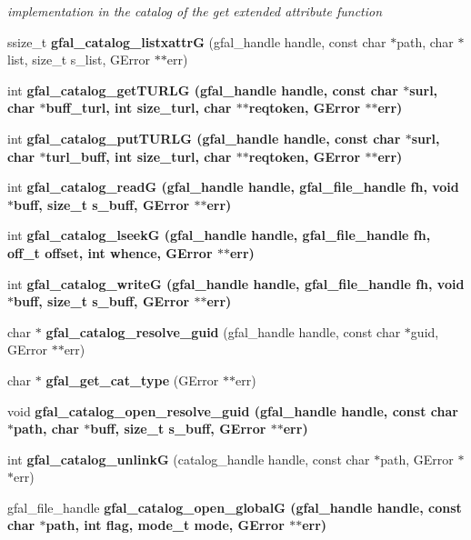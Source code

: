 \begin{CompactItemize}
\begin{CompactList}\small\item\em implementation in the catalog of the get extended attribute function \item\end{CompactList}\item 
ssize\_\-t \textbf{gfal\_\-catalog\_\-listxattr\-G} (gfal\_\-handle handle, const char $\ast$path, char $\ast$list, size\_\-t s\_\-list, GError $\ast$$\ast$err)\label{gfal__common__catalog_8c_4a6d80bf6b017570318db7a2fa1d6028}

\item 
int \bf{gfal\_\-catalog\_\-get\-TURLG} (gfal\_\-handle handle, const char $\ast$surl, char $\ast$buff\_\-turl, int size\_\-turl, char $\ast$$\ast$reqtoken, GError $\ast$$\ast$err)
\item 
int \bf{gfal\_\-catalog\_\-put\-TURLG} (gfal\_\-handle handle, const char $\ast$surl, char $\ast$turl\_\-buff, int size\_\-turl, char $\ast$$\ast$reqtoken, GError $\ast$$\ast$err)
\item 
int \bf{gfal\_\-catalog\_\-read\-G} (gfal\_\-handle handle, gfal\_\-file\_\-handle fh, void $\ast$buff, size\_\-t s\_\-buff, GError $\ast$$\ast$err)
\item 
int \bf{gfal\_\-catalog\_\-lseek\-G} (gfal\_\-handle handle, gfal\_\-file\_\-handle fh, off\_\-t offset, int whence, GError $\ast$$\ast$err)
\item 
int \bf{gfal\_\-catalog\_\-write\-G} (gfal\_\-handle handle, gfal\_\-file\_\-handle fh, void $\ast$buff, size\_\-t s\_\-buff, GError $\ast$$\ast$err)
\item 
char $\ast$ \textbf{gfal\_\-catalog\_\-resolve\_\-guid} (gfal\_\-handle handle, const char $\ast$guid, GError $\ast$$\ast$err)\label{gfal__common__catalog_8c_4955825d7c275f3dfae9a57232642370}

\item 
char $\ast$ \textbf{gfal\_\-get\_\-cat\_\-type} (GError $\ast$$\ast$err)\label{gfal__common__catalog_8c_c20aa1a376c802d0c60208854537851e}

\item 
void \bf{gfal\_\-catalog\_\-open\_\-resolve\_\-guid} (gfal\_\-handle handle, const char $\ast$path, char $\ast$buff, size\_\-t s\_\-buff, GError $\ast$$\ast$err)
\item 
int \textbf{gfal\_\-catalog\_\-unlink\-G} (catalog\_\-handle handle, const char $\ast$path, GError $\ast$$\ast$err)\label{gfal__common__catalog_8c_a1dcb0bef88f1cecc21ead5bf3812143}

\item 
gfal\_\-file\_\-handle \bf{gfal\_\-catalog\_\-open\_\-global\-G} (gfal\_\-handle handle, const char $\ast$path, int flag, mode\_\-t mode, GError $\ast$$\ast$err)
\end{CompactItemize}



